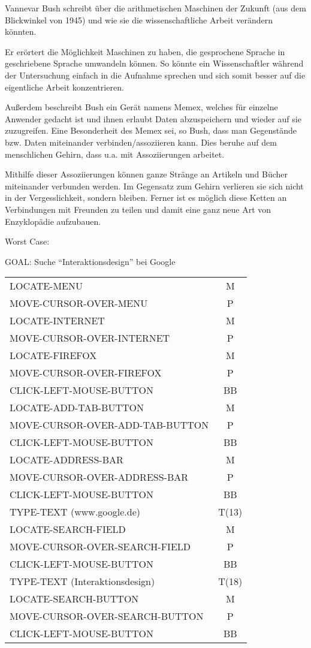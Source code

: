 \documentclass[a4paper,10pt]{scrartcl}
\begin{document}
\kopf
\renewcommand{\figurename}{Figure}


Vannevar Bush schreibt über die arithmetischen Maschinen der Zukunft (aus dem Blickwinkel von 1945) und wie sie die wissenschaftliche Arbeit verändern könnten.

Er erörtert die Möglichkeit Maschinen zu haben, die gesprochene Sprache in geschriebene Sprache umwandeln können. So könnte ein Wissenschaftler während der Untersuchung einfach in die Aufnahme sprechen und sich somit besser auf die eigentliche Arbeit konzentrieren.

Außerdem beschreibt Bush ein Gerät namens Memex, welches für einzelne Anwender gedacht ist und ihnen erlaubt Daten abzuspeichern und wieder auf sie zuzugreifen. Eine Besonderheit des Memex sei, so Bush, dass man Gegenstände bzw. Daten miteinander verbinden/assoziieren kann. Dies beruhe auf dem menschlichen Gehirn, dass u.a. mit Assoziierungen arbeitet.

Mithilfe dieser Assoziierungen können ganze Stränge an Artikeln und Bücher miteinander verbunden werden. Im Gegensatz zum Gehirn verlieren sie sich nicht in der Vergesslichkeit, sondern bleiben. Ferner ist es möglich diese Ketten an Verbindungen mit Freunden zu teilen und damit eine ganz neue Art von Enzyklopädie aufzubauen.


Worst Case:

GOAL: Suche "`Interaktionsdesign"' bei Google \\
\begin{tabular}{l|c}
	LOCATE-MENU & M \\
	MOVE-CURSOR-OVER-MENU & P \\
	LOCATE-INTERNET & M \\
	MOVE-CURSOR-OVER-INTERNET & P \\
	LOCATE-FIREFOX & M \\
	MOVE-CURSOR-OVER-FIREFOX & P \\
	CLICK-LEFT-MOUSE-BUTTON & BB \\
	LOCATE-ADD-TAB-BUTTON & M \\
	MOVE-CURSOR-OVER-ADD-TAB-BUTTON & P \\
	CLICK-LEFT-MOUSE-BUTTON & BB \\
	LOCATE-ADDRESS-BAR & M \\
	MOVE-CURSOR-OVER-ADDRESS-BAR & P \\
	CLICK-LEFT-MOUSE-BUTTON & BB \\
	TYPE-TEXT (www.google.de) & T(13) \\
	LOCATE-SEARCH-FIELD & M \\
	MOVE-CURSOR-OVER-SEARCH-FIELD & P \\
	CLICK-LEFT-MOUSE-BUTTON & BB \\
	TYPE-TEXT (Interaktionsdesign) & T(18) \\
	LOCATE-SEARCH-BUTTON & M \\
	MOVE-CURSOR-OVER-SEARCH-BUTTON & P \\
	CLICK-LEFT-MOUSE-BUTTON & BB
\end{tabular}
\end{document}

